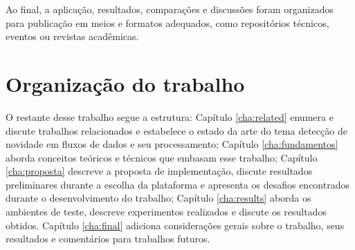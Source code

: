 Ao final, a aplicação, resultados, comparações e discussões foram organizados
para publicação em meios e formatos adequados, como repositórios técnicos,
eventos ou revistas acadêmicas.

\section{Organização do trabalho}

O restante desse trabalho segue a estrutura:
Capítulo \ref{cha:related} enumera e discute trabalhos relacionados e estabelece
o estado da arte do tema detecção de novidade em fluxos de dados e seu
processamento;
Capítulo \ref{cha:fundamentos} aborda conceitos teóricos e técnicos que embasam
esse trabalho;
Capítulo \ref{cha:proposta} descreve a proposta de implementação, discute
resultados preliminares durante a escolha da plataforma e apresenta os desafios
encontrados durante o desenvolvimento do trabalho;
Capítulo \ref{cha:results} aborda os ambientes de teste, descreve experimentos
realizados e discute os resultados obtidos.
Capítulo \ref{cha:final} adiciona considerações gerais sobre o trabalho, seus
resultados e comentários para trabalhos futuros.

